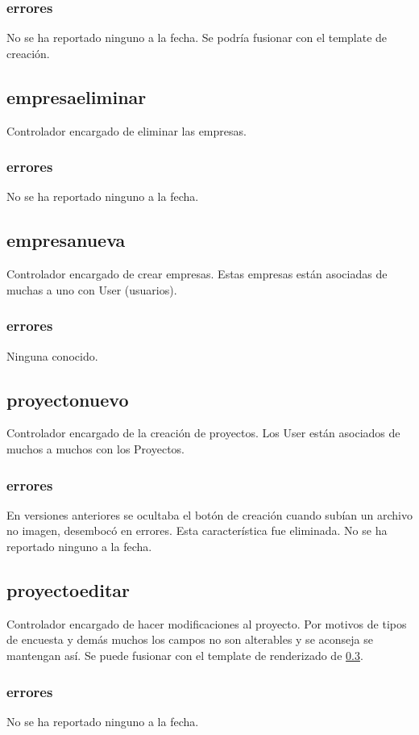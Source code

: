 \documentclass[10pt,a4paper]{book}
\begin{document}
	\subsubsection{errores}
	No se ha reportado ninguno a la fecha. Se podría fusionar con el template de creación.
	
	\subsection{empresaeliminar}
	Controlador encargado de eliminar las empresas.
	\subsubsection{errores}
	No se ha reportado ninguno a la fecha.
	
	\subsection{empresanueva}
	Controlador encargado de crear empresas. Estas empresas están asociadas de muchas a uno con User (usuarios).
	\subsubsection{errores}
	Ninguna conocido.
	
	
	\subsection{proyectonuevo}\label{proyectonuevo}
	Controlador encargado de la creación de proyectos. Los User están asociados de muchos a muchos con los Proyectos.
	\subsubsection{errores}
	En versiones anteriores se ocultaba el botón de creación cuando subían un archivo no imagen, desembocó en errores. Esta característica fue eliminada. No se ha reportado ninguno a la fecha.
	
	\subsection{proyectoeditar}
	Controlador encargado de hacer modificaciones al proyecto. Por motivos de tipos de encuesta y demás muchos los campos no son alterables y se aconseja se mantengan así. Se puede fusionar con el template de renderizado de \ref{proyectonuevo}.
	\subsubsection{errores}
	No se ha reportado ninguno a la fecha.
	
\end{document}
